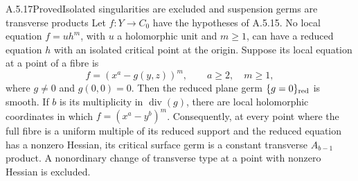 \begin{statement}{A.5.17}{Proved}{Isolated singularities are excluded and suspension germs are transverse products}
Let $f:Y\to C_0$ have the hypotheses of A.5.15.
No local equation $f=u h^m$, with $u$ a holomorphic
unit and $m\ge1$, can have a reduced equation $h$
with an isolated critical point at the origin.
Suppose its local equation at a point of a fibre is
\[
             f=(x^a-g(y,z))^m,
             \qquad a\ge2,\quad m\ge1,             \tag{A.J.38}
\]
where $g\ne0$ and $g(0,0)=0$. Then the reduced
plane germ $\{g=0\}_{\rm red}$ is smooth. If
$b$ is its multiplicity in $\operatorname{div}(g)$,
there are local holomorphic coordinates in which
$f=(x^a-y^b)^m$.
Consequently, at every point where the full fibre
is a uniform multiple of its reduced support and
the reduced equation has a nonzero Hessian, its
critical surface germ is a constant
transverse $A_{b-1}$ product. A nonordinary change
of transverse type at a point with nonzero Hessian
is excluded.
\end{statement}
